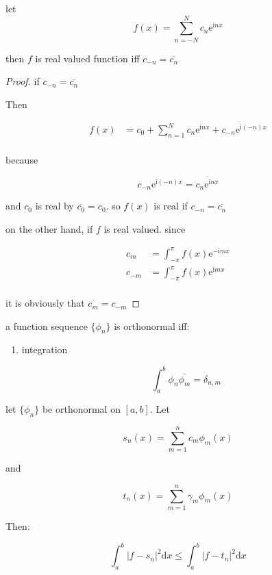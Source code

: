\begin{thm}
    let 
    \[
        f(x) = \sum_{n=-N}^{N} c_n \mathrm{e}^{\mathrm{i} nx}
    \]

    then $f$ is real valued function iff $c_{-n} = \overline{c_n}$
\end{thm}

\begin{proof}
    if $c_{-n} = \overline{c_{n}}$

    Then


    \begin{align*}
        f(x) &= c_0 + \sum_{n=1}^{N} c_n \mathrm{e}^{\mathrm{i} nx} + c_{-n} \mathrm{e}^{\mathrm{i} (-n)x}  \\
    \end{align*}

    because

    \[
c_{-n} \mathrm{e}^{\mathrm{i} (-n)x} = \overline{c_n \mathrm{e}^{\mathrm{i} nx} }
    \]

    and $c_0 $ is real by $\overline{c_0} = c_0 $. so $f(x)$ is real if $c_{-n} = \overline{c_n}$

    on the other hand, if $f$ is real valued. since

    \begin{align*}
        c_m &= \int_{-\pi}^{\pi}f(x)\mathrm{e}^{- \mathrm{i} mx}  \\
        c_{-m} &= \int_{-\pi}^{\pi}f(x)\mathrm{e}^{\mathrm{i} mx}  \\
    \end{align*}

    it is obviously that $\overline{c_m} = c_{-m}$
\end{proof}

\begin{definition}[orthonormal]
    a function sequence $\{ \phi_n \}$ is orthonormal iff:
    
    \begin{enumerate}
        \item integration
    
        \[
            \int_{a}^b \phi_n \overline{ \phi_m} = \delta_{n,m}
        \]

    \end{enumerate}
\end{definition}

\begin{thm}
    let $\{ \phi_n\}$ be orthonormal on $[a,b]$. Let

    \[
        s_n(x) = \sum_{m=1}^{n} c_m \phi_m(x)
    \]

    and

    \[
        t_n(x) = \sum_{m=1}^{n} \gamma_m \phi_m (x)
    \]

    Then:

    \[
        \int_a^b \left| f- s_n\right|^2 \mathrm{d}x \le \int_a^b \left| f- t_n\right|^2 \mathrm{d}x
    \]
\end{thm}

